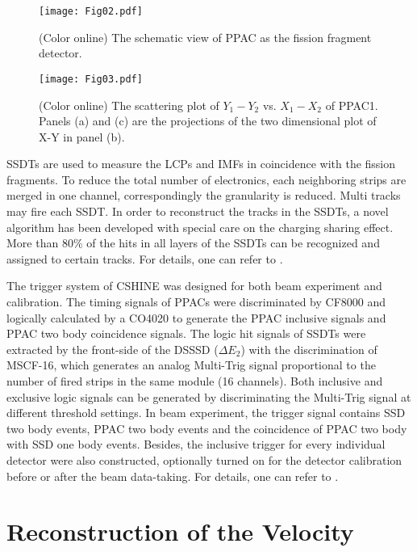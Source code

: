 \documentclass[submitting]{nst}
\begin{document}
\begin{figure}[!htb]
\texttt{[image: Fig02.pdf]}
\caption{(Color online) The schematic view of  PPAC as the fission fragment detector.}
\label{ppac}
\end{figure}

\begin{figure}[!htb]
\texttt{[image: Fig03.pdf]}
\caption{(Color online) The scattering plot of  $Y_1-Y_2$ vs. $X_1-X_2$ of PPAC1.  Panels (a) and (c) are the projections of the two dimensional plot of X-Y in panel (b).}
\label{ppac_xy}
\end{figure}

SSDTs are used to measure the LCPs and IMFs in coincidence with the fission fragments.  To reduce the total number of electronics, each neighboring strips are merged in one channel, correspondingly the granularity is reduced.  Multi tracks may fire each SSDT. In order to reconstruct the tracks in the SSDTs, a novel algorithm has been developed with special care on the charging sharing effect.  More than 80\% of the hits in all layers of the SSDTs can be recognized and assigned to certain tracks.  For details, one can refer to \cite{Guanfh2022}.  

The trigger system of CSHINE was designed for both beam experiment and calibration.  The timing signals of PPACs were discriminated by CF8000 and logically calculated by a CO4020 to generate the PPAC inclusive signals and PPAC two body coincidence signals. The logic hit signals of SSDTs were extracted by the front-side of the DSSSD ($\Delta E_2$) with the discrimination of MSCF-16, which generates an analog Multi-Trig signal proportional to the number of fired strips in the same module (16 channels). Both inclusive and exclusive logic signals can be generated by discriminating the Multi-Trig signal at different threshold settings.  In beam experiment, the trigger signal contains SSD two body events, PPAC two body events  and  the coincidence of PPAC two body with SSD one body events. Besides, the inclusive trigger for every individual detector were also constructed, optionally turned on for the detector calibration before or after the beam data-taking. For details, one can refer to  \cite{Guanfh2022}.


\section {Reconstruction of the Velocity} \label{sec.III}
\end{document}

